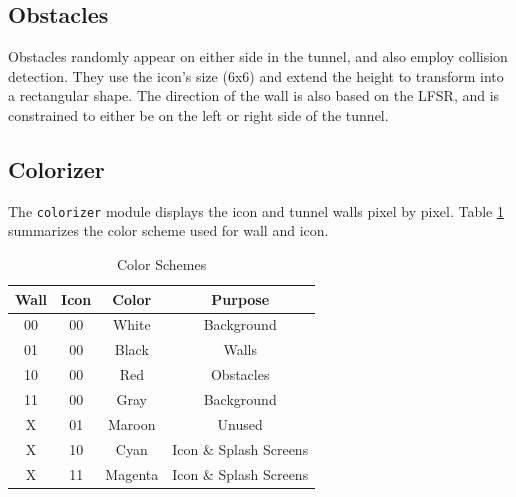 \documentclass[11pt]{article}
\begin{document}
 
\subsection{Obstacles}
	Obstacles randomly appear on either side in the tunnel, and also employ collision detection.  They use the icon's size (6x6) and extend the height to transform into a rectangular shape. The direction of the wall is also based on the LFSR, and is constrained to either be on the left or right side of the tunnel.
		
\subsection{Colorizer}

The \texttt{colorizer} module displays the icon and tunnel walls pixel by pixel.  Table \ref{colorizer} summarizes the color scheme used for wall and icon.
 
	\begin {table}
	\begin {center} 
	\vspace{15pt}
	
	\begin{tabular}{||c|c|c|c||}\hline	
		\textbf{Wall}	&	\textbf{Icon}	&	\textbf{Color}	&	\textbf{Purpose}		\\\hline
		00		&	00		&	White 	&	Background 	\\\hline
		01		&	00		&	Black 	&	Walls 		\\\hline
		10		&	00		&	Red 	&	Obstacles 	\\\hline
		11		&	00		&	Gray 	&	Background	\\\hline
		X		&	01		&	Maroon	&	Unused		\\\hline
		X		&	10		&	Cyan	&	Icon \& Splash Screens	\\\hline
		X		&	11		&	Magenta	&	Icon \& Splash Screens	\\\hline	
	\end{tabular}
		\caption {Color Schemes} \label{colorizer}
	\end{center}
	\end{table} 		




%
\end{document}
